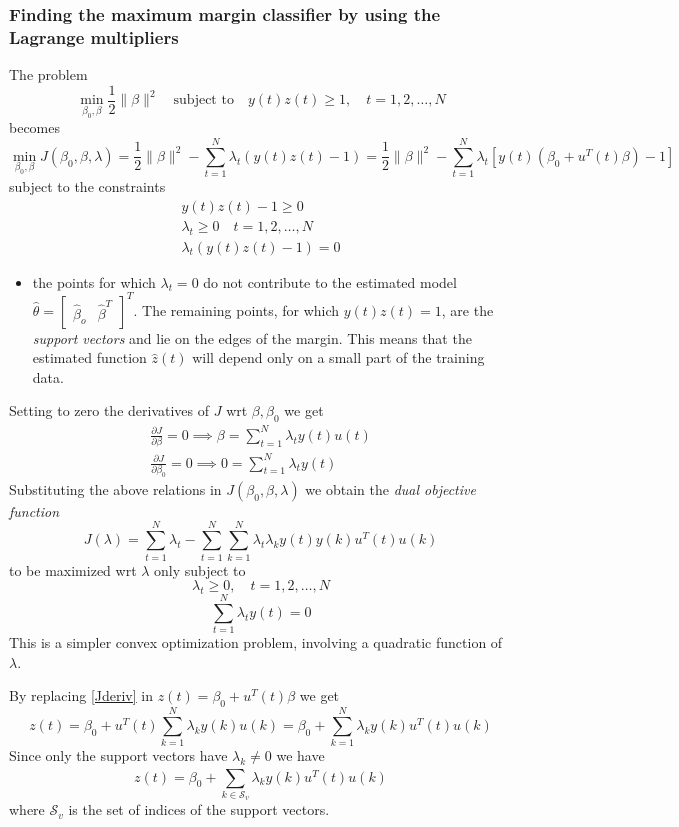 \documentclass{book}
\begin{document}
\subsubsection{Finding the maximum margin classifier by using the Lagrange multipliers}
The problem 
\[
    \min_{\beta_0,\beta}\displaystyle\frac{1}{2}\|\beta\|^2 \quad \text{subject to} \quad y(t)z(t) \geq 1, \quad t=1,2,\dots,N
\]
becomes
\[
    \min_{\beta_0,\beta}J(\beta_0,\beta,\lambda)= \displaystyle\frac{1}{2}\|\beta\|^2-\displaystyle\sum_{t=1}^{N}\lambda_t(y(t)z(t)-1)=\displaystyle\frac{1}{2}\|\beta\|^2-\displaystyle\sum_{t=1}^{N}\lambda_t[y(t)(\beta_0+u^T(t)\beta)-1]
\]
subject to the constraints 
\begin{gather*}
    y(t)z(t)-1 \geq 0\\
    \lambda_t \geq 0 \quad t=1,2,\dots,N\\
    \lambda_t(y(t)z(t)-1)=0
\end{gather*}
\begin{itemize}
    \item the points for which $\lambda_t=0$ do not contribute to the estimated model $\hat{\theta}=\begin{bmatrix}
            \hat{\beta}_o & \hat{\beta}^T
        \end{bmatrix}^T$. The remaining points, for which $y(t)z(t)=1$, are the \emph{support vectors} and lie on the edges of the margin. This means that the estimated function $\hat{z}(t)$ will depend only on a small part of the training data.
\end{itemize}
Setting to zero the derivatives of $J$ wrt $\beta,\beta_0$ we get 
\begin{gather} \label{Jderiv}
    \displaystyle\frac{\partial J}{\partial \beta}=0 \implies \beta=\displaystyle\sum_{t=1}^{N}\lambda_ty(t)u(t)\\
    \displaystyle\frac{\partial J}{\partial \beta_0}=0 \implies 0=\displaystyle\sum_{t=1}^{N}\lambda_ty(t)
\end{gather}
Substituting the above relations in $J(\beta_0,\beta,\lambda)$ we obtain the \emph{dual objective function}
\[
    J(\lambda)=\displaystyle\sum_{t=1}^{N}\lambda_t-\displaystyle\sum_{t=1}^{N}\displaystyle\sum_{k=1}^{N}\lambda_t\lambda_ky(t)y(k)u^T(t)u(k)
\]
to be maximized wrt $\lambda$ only subject to 
\[
    \lambda_t \geq 0, \quad t=1,2,\dots,N
\]
\[
    \displaystyle\sum_{t=1}^{N}\lambda_ty(t)=0
\]
This is a simpler convex optimization problem, involving a quadratic function of $\lambda$.

By replacing \ref{Jderiv} in $z(t)=\beta_0+u^T(t)\beta$ we get 
\[
    z(t)=\beta_0 + u^T(t)\displaystyle\sum_{k=1}^{N}\lambda_ky(k)u(k)=\beta_0+\displaystyle\sum_{k=1}^{N}\lambda_ky(k)u^T(t)u(k)
\]
Since only the support vectors have $\lambda_k\neq 0$ we have
\[
    z(t)=\beta_0+\displaystyle\sum_{k\in\mathcal{S}_v}^{}\lambda_ky(k)u^T(t)u(k)
\]
where $\mathcal{S}_v$ is the set of indices of the support vectors. 
\end{document}

